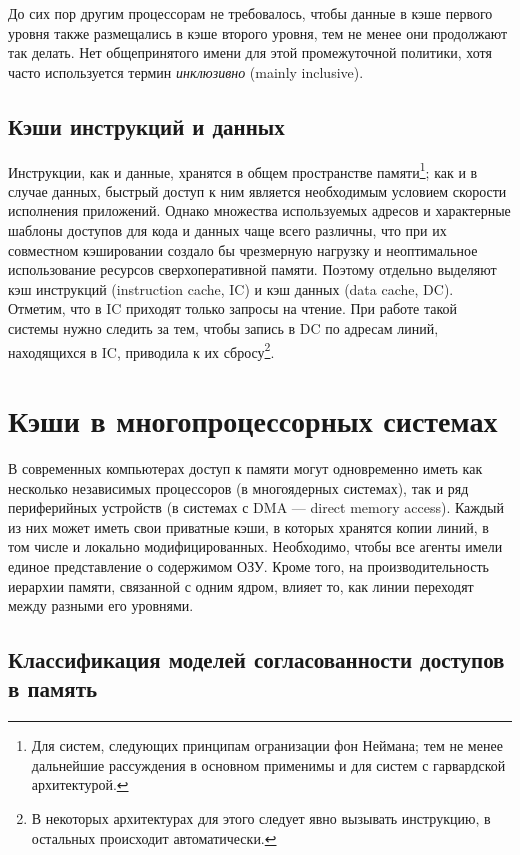 До сих пор другим процессорам не требовалось, чтобы данные в кэше первого уровня также размещались в кэше второго уровня, тем не менее они продолжают так делать. Нет общепринятого имени для этой промежуточной политики, хотя часто используется термин \textit{инклюзивно} (\abbr mainly inclusive).

\subsection{Кэши инструкций и данных}

Инструкции, как и данные, хранятся в общем пространстве памяти\footnote{Для систем, следующих принципам огранизации фон Неймана; тем не менее дальнейшие рассуждения в основном применимы и для систем с гарвардской архитектурой.}; как и в случае данных, быстрый доступ к ним является необходимым условием скорости исполнения приложений. Однако множества используемых адресов и характерные шаблоны доступов для кода и данных чаще всего различны, что при их совместном кэшировании создало бы чрезмерную нагрузку и неоптимальное использование ресурсов сверх\-опера\-тивной памяти. Поэтому отдельно выделяют кэш инструкций (\abbr instruction cache, IC) и кэш данных (\abbr data cache, DC). Отметим, что в IC приходят только запросы на чтение. При работе такой системы нужно следить за тем, чтобы запись в DC по адресам линий, находящихся в IC, приводила к их сбросу\footnote{В некоторых архитектурах для этого следует явно вызывать инструкцию, в остальных происходит автоматически.}.

\section{Кэши в многопроцессорных системах}

В современных компьютерах доступ к памяти могут одновременно иметь как несколько независимых процессоров (в многоядерных системах), так и ряд периферийных устройств (в системах с DMA --- \abbr direct memory access). Каждый из них может иметь свои приватные кэши, в которых хранятся копии линий, в том числе и локально модифицированных.  Необходимо, чтобы все агенты имели единое представление о содержимом ОЗУ. Кроме того, на производительность иерархии памяти, связанной с одним ядром, влияет то, как линии переходят между разными его уровнями.

\subsection[Классификация моделей согласованности]{Классификация моделей согласованности доступов в память}


